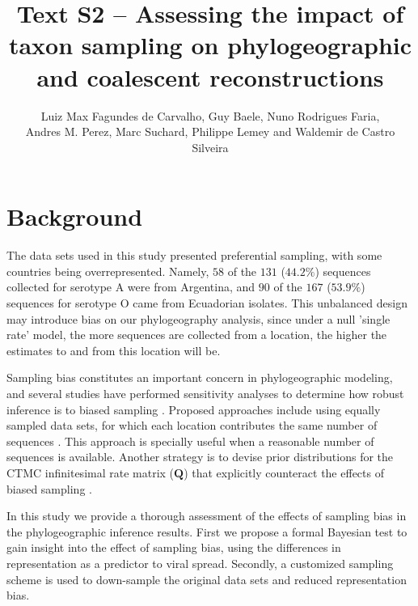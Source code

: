 \documentclass[a4paper,10pt]{article}
\title{Text S2 -- Assessing the impact of taxon sampling on phylogeographic and coalescent reconstructions} %
\author{
Luiz Max Fagundes de Carvalho,
Guy Baele,
Nuno Rodrigues Faria,\\
Andres M. Perez,
Marc Suchard,
Philippe Lemey and
Waldemir de Castro Silveira
\\}
\date{}
\begin{document}
\maketitle

\section{Background}

The data sets used in this study presented preferential sampling, with some countries being overrepresented.
Namely, $58$ of the $131$ ($44.2\%$) sequences collected for serotype A were from Argentina, and $90$ of the $167$ ($53.9\%$) sequences for serotype O came from Ecuadorian isolates.
This unbalanced design may introduce bias on our phylogeography analysis, since under a null 'single rate' model, the more sequences are collected from a location, the higher the estimates to and from this location will be. %

Sampling bias constitutes an important concern in phylogeographic modeling, and several studies have performed sensitivity analyses to determine how robust inference is to biased sampling \cite{M-Faria2012,M-Lemey2013,M-polar,M-fluPNAS}.
Proposed approaches include using equally sampled data sets, for which each location contributes the same number of sequences \cite{M-fluPNAS}.
This approach is specially useful when a reasonable number of sequences is available.
Another strategy is to devise prior distributions for the CTMC infinitesimal rate matrix ($\mathbf{Q}$) that explicitly counteract the effects of biased sampling \cite{M-Faria2012}.


In this study we provide a thorough assessment of the effects of sampling bias in the phylogeographic inference results. 
First we propose a formal Bayesian test to gain insight into the effect of sampling bias, using the differences in representation as a predictor to viral spread.
Secondly, a customized sampling scheme is used to down-sample the original data sets and reduced representation bias.
\end{document}
